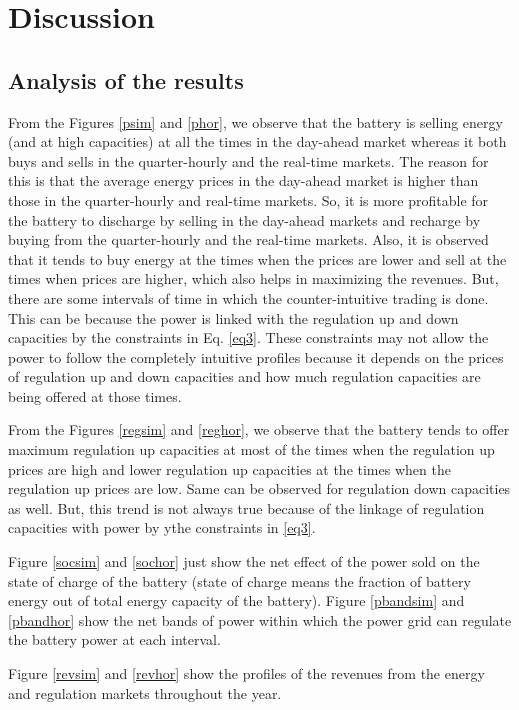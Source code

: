 \documentclass[11pt,twoside]{article}
\begin{document}
\section{Discussion}
\subsection{Analysis of the results}
From the Figures \ref{psim} and \ref{phor}, we observe that the battery is selling energy (and at high capacities) at all the times in the day-ahead market whereas it both buys and sells in the quarter-hourly and the real-time markets. The reason for this is that the average energy prices in the day-ahead market is higher than those in the quarter-hourly and real-time markets. So, it is more profitable for the battery to discharge by selling in the day-ahead markets and recharge by buying from the quarter-hourly and the real-time markets. Also, it is observed that it tends to buy energy at the times when the prices are lower and sell at the times when prices are higher, which also helps in maximizing the revenues. But, there are some intervals of time in which the counter-intuitive trading is done. This can be because the power is linked with the regulation up and down capacities by the constraints in Eq. \ref{eq3}. These constraints may not allow the power to follow the completely intuitive profiles because it depends on the prices of regulation up and down capacities and how much regulation capacities are being offered at those times. 

From the Figures \ref{regsim} and \ref{reghor}, we observe that the battery tends to offer maximum regulation up capacities at most of the times when the regulation up prices are high and lower regulation up capacities at the times when the regulation up prices are low. Same can be observed for regulation down capacities as well. But, this trend is not always true because of the linkage of regulation capacities with power by ythe constraints in \ref{eq3}.

Figure \ref{socsim} and \ref{sochor} just show the net effect of the power sold on the state of charge of the battery (state of charge means the fraction of battery energy out of total energy capacity of the battery). Figure \ref{pbandsim} and \ref{pbandhor} show the net bands of power within which the power grid can regulate the battery power at each interval.

Figure \ref{revsim} and \ref{revhor} show the profiles of the revenues from the energy and regulation markets throughout the year.
\end{document}
